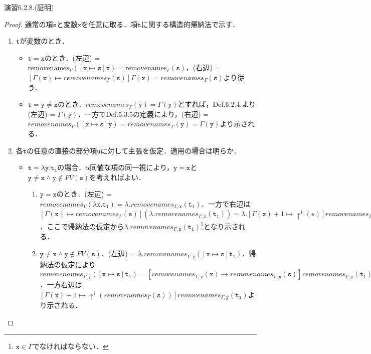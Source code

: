 \documentclass[9pt]{beamer}
\begin{document}
\begin{frame}{演習6.2.8.(証明)}
\begin{proof}
通常の項$\mathtt{s}$と変数$\mathtt{x}$を任意に取る．項$\mathtt{t}$に関する構造的帰納法で示す．
\begin{enumerate}
\item $\mathtt{t}$が変数のとき．\begin{itemize}
\item $\mathtt{t = x}$のとき．(左辺) = $\mathrm{removenames}_{\Gamma}(\mathtt{\left[x\mapsto s\right]x}) = \mathrm{removenames}_{\Gamma}(\mathtt{s})$，(右辺) = $\left[\Gamma(\mathtt{x})\mapsto removenames_{\Gamma}(\mathtt{s})\right]\Gamma(\mathtt{x}) = removenames_{\Gamma}(\mathtt{s})$より従う．
\item $\mathtt{t = y\neq x}$のとき．$removenames_{\Gamma}(\mathtt{y}) = \Gamma(\mathtt{y})$とすれば，Def.6.2.4.より(左辺) = $\Gamma(\mathtt{y})$．一方でDef.5.3.5の定義により，(右辺) = $removenames_{\Gamma}(\mathtt{\left[x\mapsto s\right]y}) =removenames_{\Gamma} (\mathtt{y}) = \Gamma(\mathtt{y})$より示される．
\end{itemize}
\item 各$\mathtt{t}$の任意の直接の部分項$\mathtt{u}$に対して主張を仮定．適用の場合は明らか．\begin{itemize}
\item $\mathtt{t = \lambda y. t_{1} }$の場合．$\alpha$同値な項の同一視により，$\mathtt{y = x}$と$\mathtt{y \neq x}\land \mathtt{y}\notin FV(\mathtt{s})$を考えればよい．\begin{enumerate}
\item $\mathtt{y = x}$のとき．(左辺) = $removenames_{\Gamma}(\mathtt{\lambda x. t_{1}}) = \lambda. removenames_{\Gamma, \mathtt{x}}(\mathtt{t_{1}})$．一方で右辺は$\left[\Gamma(\mathtt{x})\mapsto removenames_{\Gamma}(\mathtt{s})\right](\lambda. removenames_{\Gamma,\mathtt{x}}(\mathtt{t_{1}})) = \lambda. \left[\Gamma(\mathtt{x}) + 1\mapsto \uparrow^{1}(s)\right]removenames_{\Gamma,\mathtt{x}}(\mathtt{t_{1}})$．ここで帰納法の仮定から$\lambda .removenames_{\Gamma, \mathtt{x}}(\mathtt{t_{1}})$\footnote{$\mathtt{x}\in\Gamma$でなければならない．}となり示される．
\item $\mathtt{y \neq x}\land \mathtt{y}\notin FV(\mathtt{s})$．(左辺) = $\lambda. removenames_{\Gamma, \mathtt{y}}(\mathtt{\left[x\mapsto s\right]t_{1}})$．帰納法の仮定により$removenames_{\Gamma, \mathtt{y}}(\mathtt{\left[x\mapsto s\right]t_{1}}) = \left[removenames_{\Gamma, \mathtt{y}}(\mathtt{x})\mapsto removenames_{\Gamma, y}(\mathtt{s})\right]removenames_{\Gamma, \mathtt{y}}(\mathtt{t_{1}})$．一方右辺は$\left[\Gamma(\mathtt{x}) + 1\mapsto \uparrow^{1}(removenames_{\Gamma}(\mathtt{s}))\right]removenames_{\Gamma, \mathtt{y}}(\mathtt{t_{1}})$より示される．
\end{enumerate}
\end{itemize}
\end{enumerate}
\end{proof}
\end{frame}
\end{document}
